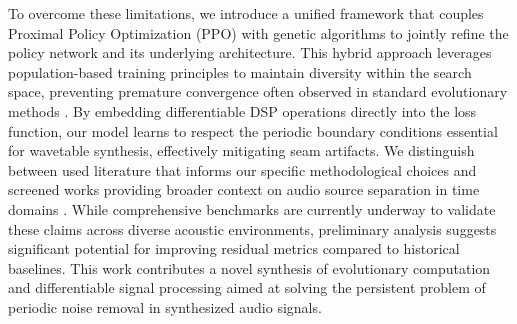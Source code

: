 To overcome these limitations, we introduce a unified framework that couples Proximal Policy Optimization (PPO) with genetic algorithms to jointly refine the policy network and its underlying architecture. This hybrid approach leverages population-based training principles to maintain diversity within the search space, preventing premature convergence often observed in standard evolutionary methods \cite{jaderberg2017}. By embedding differentiable DSP operations directly into the loss function, our model learns to respect the periodic boundary conditions essential for wavetable synthesis, effectively mitigating seam artifacts. We distinguish between used literature that informs our specific methodological choices and screened works providing broader context on audio source separation in time domains \cite{stoller2018;purwins2019}. While comprehensive benchmarks are currently underway to validate these claims across diverse acoustic environments, preliminary analysis suggests significant potential for improving residual metrics compared to historical baselines. This work contributes a novel synthesis of evolutionary computation and differentiable signal processing aimed at solving the persistent problem of periodic noise removal in synthesized audio signals.
